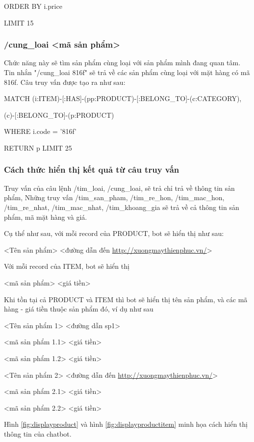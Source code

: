 ORDER BY i.price  

LIMIT 15

\subsubsection{/cung\_loai <mã sản phẩm>}

Chức năng này sẽ tìm sản phẩm cùng loại với sản phẩm mình đang quan tâm. Tin nhắn "/cung\_loai 816f" sẽ trả về các sản phẩm cùng loại với mặt hàng có mã 816f. Câu truy vấn được tạo ra như sau: 

MATCH (i:ITEM)-[:HAS]-(pp:PRODUCT)-[:BELONG\_TO]-(c:CATEGORY),

(c)-[:BELONG\_TO]-(p:PRODUCT)  

WHERE i.code = '816f'

RETURN p LIMIT 25



\subsubsection{Cách thức hiển thị kết quả từ câu truy vấn}

Truy vấn của câu lệnh /tim\_loai, /cung\_loai, sẽ trả chỉ trả về thông tin sản phẩm, Những truy vấn /tim\_san\_pham, /tim\_re\_hon, /tim\_mac\_hon, /tim\_re\_nhat, /tim\_mac\_nhat, /tim\_khoang\_gia sẽ trả về cả thông tin sản phẩm, mã mặt hàng và giá. 

Cụ thể như sau, với mỗi record của PRODUCT, bot sẽ hiển thị như sau: 

<Tên sản phẩm> <đường dẫn đến \url{http://xuongmaythienphuc.vn/}> 

\smallskip

Với mỗi record của ITEM, bot sẽ hiển thị 

<mã sản phẩm> <giá tiền> 

\smallskip 

Khi tồn tại cả PRODUCT và ITEM thì bot sẽ hiển thị tên sản phẩm, và các mã hàng - giá tiền thuộc sản phẩm đó, ví dụ như sau 

<Tên sản phẩm 1> <đường dẫn sp1> 

<mã sản phẩm 1.1> <giá tiền> 

<mã sản phẩm 1.2> <giá tiền> 

<Tên sản phẩm 2> <đường dẫn đến \url{http://xuongmaythienphuc.vn/}> 

<mã sản phẩm 2.1> <giá tiền> 

<mã sản phẩm 2.2> <giá tiền> 

Hình \ref{fig:displayproduct} và hình \ref{fig:displayproductitem} minh họa cách hiển thị thông tin của chatbot. 

